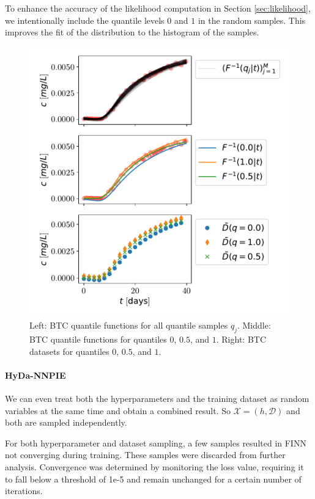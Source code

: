 To enhance the accuracy of the likelihood computation in Section \vref{sec:likelihood}, we intentionally include the quantile levels $0$ and $1$ in the random samples. This improves the fit of the distribution to the histogram of the samples.

\begin{figure}[h]
    \centering
    \includegraphics{figs/btc_dataspan_quantiles.pdf}
    \caption{Left: BTC quantile functions for all quantile samples $q_j$. Middle: BTC quantile functions for quantiles $0$, $0.5$, and $1$. Right: BTC datasets for quantiles $0$, $0.5$, and $1$.}
    \label{fig:btc_dataspan_quantiles}
\end{figure}



\paragraph{HyDa-NNPIE}

We can even treat both the hyperparameters and the training dataset as random variables at the same time and obtain a combined result. So $\mathcal{X} = (h, \mathcal{D})$ and both are sampled independently.

For both hyperparameter and dataset sampling, a few samples resulted in FINN not converging during training. These samples were discarded from further analysis. Convergence was determined by monitoring the loss value, requiring it to fall below a threshold of 1e-5 and remain unchanged for a certain number of iterations.


